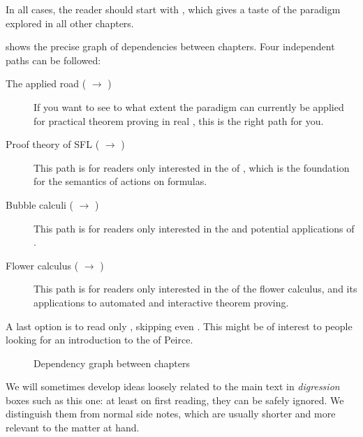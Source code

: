 \begin{emphpar}
  In all cases, the reader should start with , which gives a taste of
  the  paradigm explored in all other chapters.
\end{emphpar}

 shows the precise graph of dependencies between chapters.
Four independent paths can be followed:
\begin{description}
  \item[The applied road ( $\to$ )] If
  you want to see to what extent the  paradigm can currently be applied for
  practical theorem proving in real , this is the right path for
  you.

  \item[Proof theory of SFL ( $\to$ )]
  This path is for readers only interested in the  of , which is the foundation for the semantics of  actions on 
  formulas.

  \item[Bubble calculi ( $\to$ )]
  This path is for readers only interested in the  and potential
  applications of .
  
  \item[Flower calculus ( $\to$ )] This path is for
  readers only interested in the  of the flower calculus, and its
  applications to automated and interactive theorem proving.
\end{description}

A last option is to read only , skipping even . This might
be of interest to people looking for an introduction to the 
of Peirce.

\begin{figure*}
  \caption{Dependency graph between chapters}
\end{figure*}

\begin{digression}
  We will sometimes develop ideas loosely related to the main text in
  \emph{digression} boxes such as this one: at least on first reading, they can
  be safely ignored. We distinguish them from normal side notes, which are
  usually shorter and more relevant to the matter at hand.
\end{digression}

